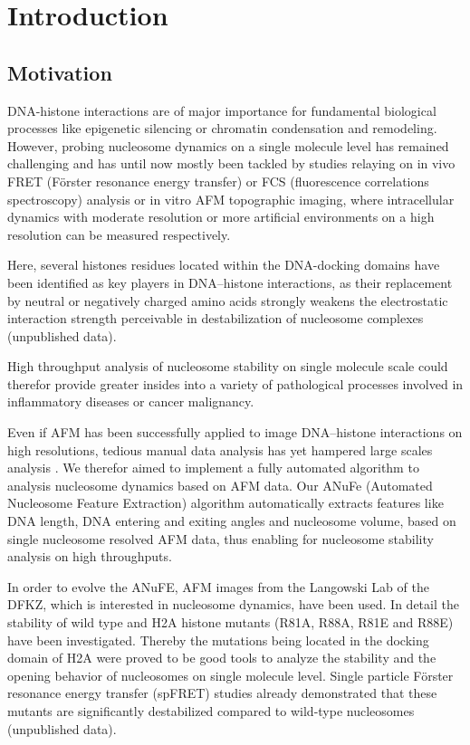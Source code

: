 \documentclass{article}
\begin{document}
\section{Introduction}\label{sec: Introduction}
\subsection{Motivation}\label{sec: Motivation}

DNA-histone interactions are of major importance for fundamental biological processes like epigenetic silencing or chromatin condensation and remodeling. However, probing nucleosome dynamics on a single molecule level has remained challenging and has until now mostly been tackled by studies relaying on in vivo FRET (Förster resonance energy transfer) or FCS (fluorescence correlations spectroscopy) \cite{sharma2008dna} analysis or in vitro AFM topographic imaging, where intracellular dynamics with moderate resolution or more artificial environments on a high resolution can be measured respectively. 


Here, several histones residues located within the DNA-docking domains have been identified as key players in DNA–histone interactions, as their replacement by neutral or negatively charged amino acids strongly weakens the electrostatic interaction strength perceivable in destabilization of nucleosome complexes (unpublished data). 


High throughput analysis of nucleosome stability on single molecule scale could therefor provide greater insides into a variety of pathological processes involved in inflammatory diseases or cancer malignancy. 


Even if AFM has been successfully applied to image DNA–histone interactions on high resolutions, tedious manual data analysis has yet hampered large scales analysis \cite{sato1999atomic}. We therefor aimed to implement a fully automated algorithm to analysis nucleosome dynamics based on AFM data. Our ANuFe (Automated Nucleosome Feature Extraction) algorithm automatically extracts features like DNA length, DNA entering and exiting angles and nucleosome volume, based on single nucleosome resolved AFM data, thus enabling for nucleosome stability analysis on high throughputs. 


In order to evolve the ANuFE, AFM images from the Langowski Lab of the DFKZ, which is interested in nucleosome dynamics, have been used. In detail the stability of wild type and H2A histone mutants (R81A, R88A, R81E and R88E) have been investigated. Thereby the mutations being located in the docking domain of H2A were proved to be good tools to analyze the stability and the opening behavior of nucleosomes on single molecule level. Single particle Förster resonance energy transfer (spFRET) studies already demonstrated that these mutants are significantly destabilized compared to wild-type nucleosomes (unpublished data). 
\end{document}
